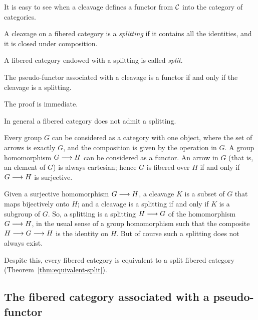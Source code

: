 \begin{3   FIBERED CATEGORIES}
\begin{3.1 Fibered categories}


It is easy to see when a cleavage defines a functor from $\mathcal{C}$ into the category of categories.

\begin{definition}
A cleavage on a fibered category is a \emph{splitting} if it contains all the identities, and it is closed under composition.

A fibered category endowed with a splitting is called \emph{split}.
\end{definition}

\begin{proposition}
The pseudo-functor associated with a cleavage is a functor if and only if the cleavage is a splitting.
\end{proposition}

The proof is immediate.

In general a fibered category does not admit a splitting.

\begin{example}\label{ex:fibered-nosplitting}
Every group $G$ can be considered as a category with one object, where the set of arrows is exactly $G$, and the composition is given by the operation in $G$. A group homomorphism $G \arr H$ can be considered as a functor. An arrow in $G$ (that is, an element of $G$) is always cartesian; hence $G$ is fibered over $H$ if and only if $G \arr H$ is surjective.

Given a surjective homomorphism $G \arr H$, a cleavage $K$ is a subset of $G$ that maps bijectively onto $H$; and a cleavage is a splitting if and only if $K$ is a subgroup of $G$. So, a splitting is a splitting $H \arr  G$ of the homomorphism $G \arr H$, in the usual sense of a group homomorphism such that the composite $H \arr G \arr H$ is the identity on $H$. But of course such a splitting does not always exist.
\end{example}

Despite this, every fibered category is equivalent to a split fibered category (Theorem~\ref{thm:equivalent-split}).



\subsection{The fibered category associated with a pseudo-functor} \label{subsec:presheaf-cat}


\end{3.1 Fibered categories}
\end{3   FIBERED CATEGORIES}
